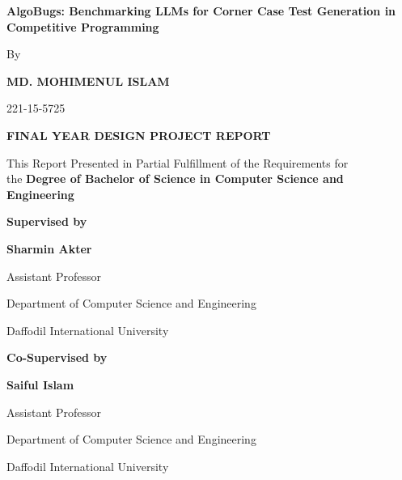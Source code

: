 \begin{titlepage}
    \setlength{\parskip}{0pt}
    \centering

    \vspace*{1.0cm}

    {\huge\bfseries AlgoBugs: Benchmarking LLMs for Corner Case Test Generation in Competitive Programming\par}

    \vspace{0.6cm}

    {\Large By\par}
    \vspace{0.3cm}
    {\large\bfseries MD. MOHIMENUL ISLAM\par}
    {\large 221-15-5725\par}

    \vspace{0.6cm}

    {\large\bfseries FINAL YEAR DESIGN PROJECT REPORT\par}

    \vspace{0.4cm}

    {\large This Report Presented in Partial Fulfillment of the Requirements for\\
    the \textbf{Degree of Bachelor of Science in Computer Science and\\
    Engineering}\par}

    \vfill

    {\large\textbf{Supervised by}\par}
    \vspace{0.2cm}
    {\large\textbf{Sharmin Akter}\par}
    {\large Assistant Professor\par}
    {\large Department of Computer Science and Engineering\par}
    {\large Daffodil International University\par}

    \vspace{0.5cm}

    {\large\textbf{Co-Supervised by}\par}
    \vspace{0.2cm}
    {\large\textbf{Saiful Islam}\par}
    {\large Assistant Professor\par}
    {\large Department of Computer Science and Engineering\par}
    {\large Daffodil International University\par}


\end{titlepage}
